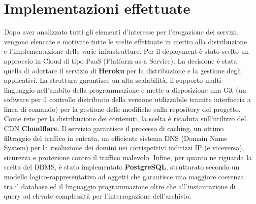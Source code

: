 \section{Implementazioni effettuate}
Dopo aver analizzato tutti gli elementi d'interesse per l'erogazione dei servizi, vengono elencate e motivate tutte le scelte effettuate in merito alla distribuzione e l'implementazione delle varie infrastrutture. \hfill \break
Per il deployment è stato scelto un approccio in Cloud di tipo PaaS (Platform as a Service). La decisione è stata quella di adottare il servizio di \textbf{Heroku} per la distribuzione e la gestione degli applicativi. La struttura garantisce un alta scalabilità, il supporto multi-linguaggio nell'ambito della programmazione e mette a disposizione una Git (un software per il controllo distribuito della versione utilizzabile tramite interfaccia a linea di comando) per la gestione delle modifiche sulla repository del progetto.\hfill \break
Come rete per la distribuzione dei contenuti, la scelta è ricaduta sull'utilizzo del CDN \textbf{Cloudflare}. Il servizio garantisce il processo di caching, un ottimo filtraggio del traffico in entrata, un efficiente sistema DNS (Domain Name System) per la risoluzione dei domini nei corrispettivi indirizzi IP (e viceversa), sicurezza e protezione contro il traffico malevolo. \hfill \break
Infine, per quanto ne riguarda la scelta del DBMS, è stato implementato \textbf{PostgreSQL}, strutturato secondo un modello logico-rappresentativo ad oggetti che garantisce una maggiore coerenza tra il database ed il linguaggio programmazione oltre che all'instaurazione di query ad elevate complessità per l'interrogazione dell'archivio.